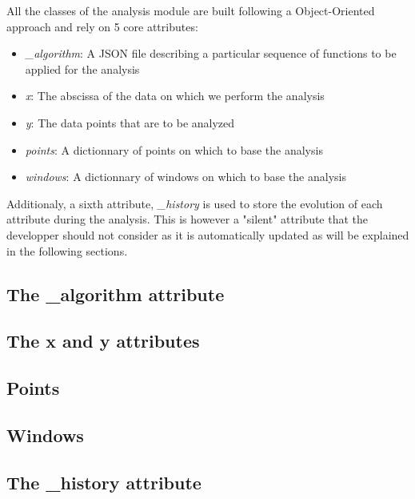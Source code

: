 All the classes of the analysis module are built following a Object-Oriented approach and rely on 5 core attributes:
\begin{itemize}
    \item \textit{\_algorithm}: A JSON file describing a particular sequence of functions to be applied for the analysis
    \item \textit{x}: The abscissa of the data on which we perform the analysis
    \item \textit{y}: The data points that are to be analyzed
    \item \textit{points}: A dictionnary of points on which to base the analysis
    \item \textit{windows}: A dictionnary of windows on which to base the analysis
\end{itemize}

Additionaly, a sixth attribute, \textit{\_history} is used to store the evolution of each attribute during the analysis. This is however a "silent" attribute that the developper should not consider as it is automatically updated as will be explained in the following sections.


\subsection{The \_algorithm attribute} \label{subsec:analysis.attributes.algorithm}
    

\subsection{The x and y attributes} \label{subsec:analysis.attributes.x_and_y}
    

\subsection{Points} \label{subsec:analysis.attributes.points}
    

\subsection{Windows} \label{subsec:analysis.attributes.windows}
    

\subsection{The \_history attribute} \label{subsec:analysis.attributes.history}
    
